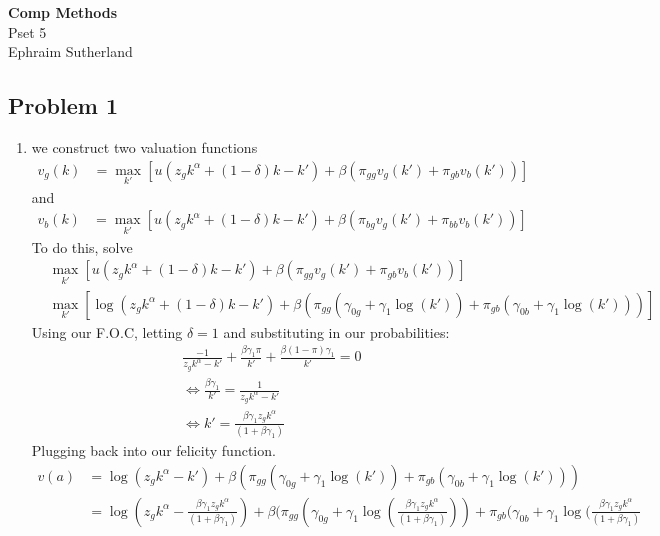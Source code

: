 \documentclass[12pt]{article}
\begin{document}
\begin{center}
{\large \bf Comp Methods }   \\ \large Pset 5 \\ Ephraim Sutherland
\end{center}

\subsection*{Problem 1}

\begin{enumerate}

	\item we construct two valuation functions
		\begin{align*}
			v_g (k) &= \max_{k'} [ u(z_g k^{\alpha} + (1 - \delta) k - k') + \beta ( \pi_{gg} v_g (k') + \pi_{gb} v_b (k')) ]
		\end{align*} 
		and 
		\begin{align*}
			v_b (k) &= \max_{k'} [ u(z_g k^{\alpha} + (1 - \delta) k - k') + \beta ( \pi_{bg} v_g (k') + \pi_{bb} v_b (k')) ]
		\end{align*} 
		To do this, solve
		\begin{align*}
	 &\max_{k'} [ u(z_g k^{\alpha} + (1 - \delta) k - k') + \beta ( \pi_{gg} v_g (k') + \pi_{gb} v_b (k')) ] \\
	 &\max_{k'} [ \log(z_g k^{\alpha} + (1 - \delta) k - k') + \beta ( \pi_{gg} ( \gamma_{0g} + \gamma_1 \log (k')) + \pi_{gb}(\gamma_{0b} + \gamma_1 \log (k'))) ]
		\end{align*} 
		Using our F.O.C, letting $\delta = 1$ and substituting in our probabilities:
		\begin{align*}
			\frac{-1}{z_g k^{\alpha}   - k'} + \frac{\beta \gamma_1 \pi}{k'} + \frac{\beta ( 1- \pi) \gamma_1}{k'} =0 \\
			\iff \frac{\beta \gamma_1}{k'} = \frac{1}{z_g k^{\alpha}  - k'} \\
				\iff k' = \frac{\beta \gamma_1z_g k^{\alpha}  }{(1 + \beta \gamma_1 )}
				\end{align*} 
				Plugging back into our felicity function.
				\begin{align*}
					v(a) &= \log(z_g k^{\alpha}   - k') + \beta ( \pi_{gg} ( \gamma_{0g} + \gamma_1 \log (k')) + \pi_{gb}(\gamma_{0b} + \gamma_1 \log (k'))) \\
					     &=\log(z_g k^{\alpha}   - \frac{\beta \gamma_1z_g k^{\alpha}  }{(1 + \beta \gamma_1 )}) + \beta ( \pi_{gg} ( \gamma_{0g} + \gamma_1 \log (\frac{\beta \gamma_1z_g k^{\alpha}  }{(1 + \beta \gamma_1 )})) + \pi_{gb}(\gamma_{0b} + \gamma_1 \log (\frac{\beta \gamma_1z_g k^{\alpha}  }{(1 + \beta \gamma_1 )} \\

\end{align*}
\end{enumerate}
\end{document}

